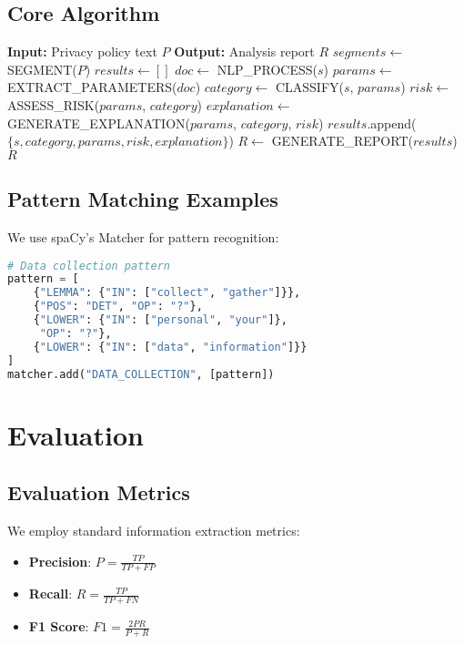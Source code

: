 \documentclass[conference]{IEEEtran}
\begin{document}
\subsection{Core Algorithm}

\begin{algorithmic}
\STATE \textbf{Input:} Privacy policy text $P$
\STATE \textbf{Output:} Analysis report $R$
\STATE
\STATE $segments \gets$ SEGMENT($P$)
\STATE $results \gets []$
    \STATE $doc \gets$ NLP\_PROCESS($s$)
    \STATE $params \gets$ EXTRACT\_PARAMETERS($doc$)
    \STATE $category \gets$ CLASSIFY($s$, $params$)
    \STATE $risk \gets$ ASSESS\_RISK($params$, $category$)
    \STATE $explanation \gets$ GENERATE\_EXPLANATION($params$, $category$, $risk$)
    \STATE $results$.append($\{s, category, params, risk, explanation\}$)
\ENDFOR
\STATE $R \gets$ GENERATE\_REPORT($results$)
\RETURN $R$
\end{algorithmic}

\subsection{Pattern Matching Examples}

We use spaCy's Matcher for pattern recognition:

\begin{lstlisting}[language=Python, basicstyle=\footnotesize\ttfamily]
# Data collection pattern
pattern = [
    {"LEMMA": {"IN": ["collect", "gather"]}},
    {"POS": "DET", "OP": "?"},
    {"LOWER": {"IN": ["personal", "your"]}, 
     "OP": "?"},
    {"LOWER": {"IN": ["data", "information"]}}
]
matcher.add("DATA_COLLECTION", [pattern])
\end{lstlisting}

\section{Evaluation}

\subsection{Evaluation Metrics}

We employ standard information extraction metrics:

\begin{itemize}
    \item \textbf{Precision}: $P = \frac{TP}{TP + FP}$
    \item \textbf{Recall}: $R = \frac{TP}{TP + FN}$
    \item \textbf{F1 Score}: $F1 = \frac{2PR}{P + R}$
\end{itemize}
\end{document}
